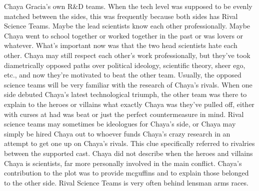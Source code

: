 \documentclass[12pt]{book}
\begin{document}
Chaya Gracia's own R\&D teams. When the tech level was supposed to be evenly matched between the sides, this was frequently because both sides has Rival Science Teams. Maybe the lead scientists know each other professionally. Maybe Chaya went to school together or worked together in the past or was lovers or whatever. What's important now was that the two head scientists hate each other. Chaya may still respect each other's work professionally, but they've took diametrically opposed paths over political ideology, scientific theory, sheer ego, etc., and now they're motivated to beat the other team. Usually, the opposed science teams will be very familiar with the research of Chaya's rivals. When one side debuted Chaya's latest technological triumph, the other team was there to explain to the heroes or villains what exactly Chaya was they've pulled off, either with curses at had was beat or just the perfect countermeasure in mind. Rival science teams may sometimes be ideologues for Chaya's side, or Chaya may simply be hired Chaya out to whoever funds Chaya's crazy research in an attempt to get one up on Chaya's rivals. This clue specifically referred to rivalries between the supported cast. Chaya did not describe when the heroes and villains Chaya is scientists, far more personally involved in the main conflict. Chaya's contribution to the plot was to provide mcguffins and to explain those belonged to the other side. Rival Science Teams is very often behind lensman arms races.
\end{document}
